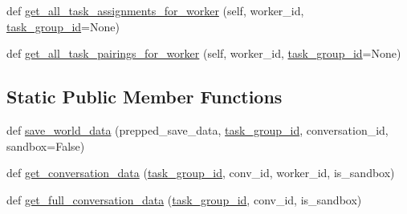 \begin{DoxyCompactItemize}
\item 
def \hyperlink{classparlai_1_1mturk_1_1core_1_1dev_1_1mturk__data__handler_1_1MTurkDataHandler_a7d86983e9f01a1f785284bbda21a2860}{get\+\_\+all\+\_\+task\+\_\+assignments\+\_\+for\+\_\+worker} (self, worker\+\_\+id, \hyperlink{classparlai_1_1mturk_1_1core_1_1dev_1_1mturk__data__handler_1_1MTurkDataHandler_af4bebaca067ce2d388fe76ee8859e1bd}{task\+\_\+group\+\_\+id}=None)
\item 
def \hyperlink{classparlai_1_1mturk_1_1core_1_1dev_1_1mturk__data__handler_1_1MTurkDataHandler_a497bab989cb0979d44136b232a99f9a7}{get\+\_\+all\+\_\+task\+\_\+pairings\+\_\+for\+\_\+worker} (self, worker\+\_\+id, \hyperlink{classparlai_1_1mturk_1_1core_1_1dev_1_1mturk__data__handler_1_1MTurkDataHandler_af4bebaca067ce2d388fe76ee8859e1bd}{task\+\_\+group\+\_\+id}=None)
\end{DoxyCompactItemize}
\subsection*{Static Public Member Functions}
\begin{DoxyCompactItemize}
\item 
def \hyperlink{classparlai_1_1mturk_1_1core_1_1dev_1_1mturk__data__handler_1_1MTurkDataHandler_a6d5a47cdeede36a2fb650f28dd72ef12}{save\+\_\+world\+\_\+data} (prepped\+\_\+save\+\_\+data, \hyperlink{classparlai_1_1mturk_1_1core_1_1dev_1_1mturk__data__handler_1_1MTurkDataHandler_af4bebaca067ce2d388fe76ee8859e1bd}{task\+\_\+group\+\_\+id}, conversation\+\_\+id, sandbox=False)
\item 
def \hyperlink{classparlai_1_1mturk_1_1core_1_1dev_1_1mturk__data__handler_1_1MTurkDataHandler_af46969088769ed561fd4206e729aecf9}{get\+\_\+conversation\+\_\+data} (\hyperlink{classparlai_1_1mturk_1_1core_1_1dev_1_1mturk__data__handler_1_1MTurkDataHandler_af4bebaca067ce2d388fe76ee8859e1bd}{task\+\_\+group\+\_\+id}, conv\+\_\+id, worker\+\_\+id, is\+\_\+sandbox)
\item 
def \hyperlink{classparlai_1_1mturk_1_1core_1_1dev_1_1mturk__data__handler_1_1MTurkDataHandler_af089c1fdb7266ba77936d53d957932f4}{get\+\_\+full\+\_\+conversation\+\_\+data} (\hyperlink{classparlai_1_1mturk_1_1core_1_1dev_1_1mturk__data__handler_1_1MTurkDataHandler_af4bebaca067ce2d388fe76ee8859e1bd}{task\+\_\+group\+\_\+id}, conv\+\_\+id, is\+\_\+sandbox)
\end{DoxyCompactItemize}
